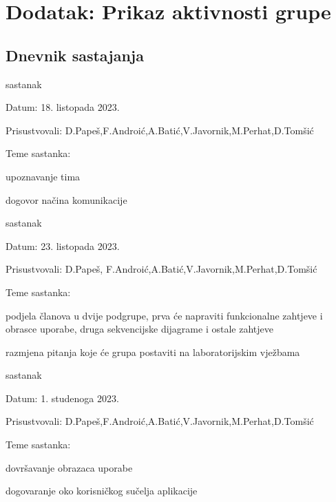 \chapter*{Dodatak: Prikaz aktivnosti grupe}
		
		\section*{Dnevnik sastajanja}
		
		\begin{packed_enum}
			\item  sastanak
			
			\item[] \begin{packed_item}
				\item Datum: 18. listopada 2023.
				\item Prisustvovali: D.Papeš,F.Androić,A.Batić,V.Javornik,M.Perhat,D.Tomšić
				\item Teme sastanka:
				\begin{packed_item}
					\item upoznavanje tima
					\item dogovor načina komunikacije
				\end{packed_item}
			\end{packed_item}
			
			\item  sastanak
			\item[] \begin{packed_item}
				\item Datum: 23. listopada 2023.
				\item Prisustvovali: D.Papeš, F.Androić,A.Batić,V.Javornik,M.Perhat,D.Tomšić
				\item Teme sastanka:
				\begin{packed_item}
					\item podjela članova u dvije podgrupe, prva će napraviti funkcionalne zahtjeve i obrasce uporabe, druga sekvencijske dijagrame i ostale zahtjeve
					\item razmjena pitanja koje će grupa postaviti na laboratorijskim vježbama
				\end{packed_item}
			\end{packed_item}
			
			\item  sastanak
			\item[] \begin{packed_item}
				\item Datum: 1. studenoga 2023.
				\item Prisustvovali: D.Papeš,F.Androić,A.Batić,V.Javornik,M.Perhat,D.Tomšić
				\item Teme sastanka:
				\begin{packed_item}
					\item dovršavanje obrazaca uporabe
					\item dogovaranje oko korisničkog sučelja aplikacije
				\end{packed_item}
			\end{packed_item}
			

\end{packed_enum}
